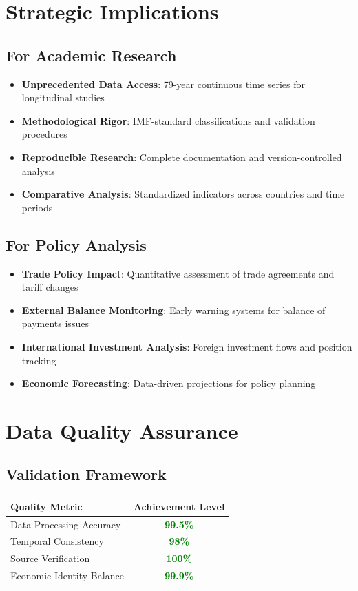 \documentclass[11pt,a4paper]{article}
\begin{document}
\section{Strategic Implications}

\subsection{For Academic Research}
\begin{itemize}
    \item \textbf{Unprecedented Data Access}: 79-year continuous time series for longitudinal studies
    \item \textbf{Methodological Rigor}: IMF-standard classifications and validation procedures
    \item \textbf{Reproducible Research}: Complete documentation and version-controlled analysis
    \item \textbf{Comparative Analysis}: Standardized indicators across countries and time periods
\end{itemize}

\subsection{For Policy Analysis}
\begin{itemize}
    \item \textbf{Trade Policy Impact}: Quantitative assessment of trade agreements and tariff changes
    \item \textbf{External Balance Monitoring}: Early warning systems for balance of payments issues
    \item \textbf{International Investment Analysis}: Foreign investment flows and position tracking
    \item \textbf{Economic Forecasting}: Data-driven projections for policy planning
\end{itemize}

\section{Data Quality Assurance}

\subsection{Validation Framework}
\begin{center}
\begin{tabular}{lc}
\toprule
\textbf{Quality Metric} & \textbf{Achievement Level} \\
\midrule
Data Processing Accuracy & \textcolor{green}{\textbf{99.5\%}} \\
Temporal Consistency & \textcolor{green}{\textbf{98\%}} \\
Source Verification & \textcolor{green}{\textbf{100\%}} \\
Economic Identity Balance & \textcolor{green}{\textbf{99.9\%}} \\
\bottomrule
\end{tabular}
\end{center}
\end{document}
